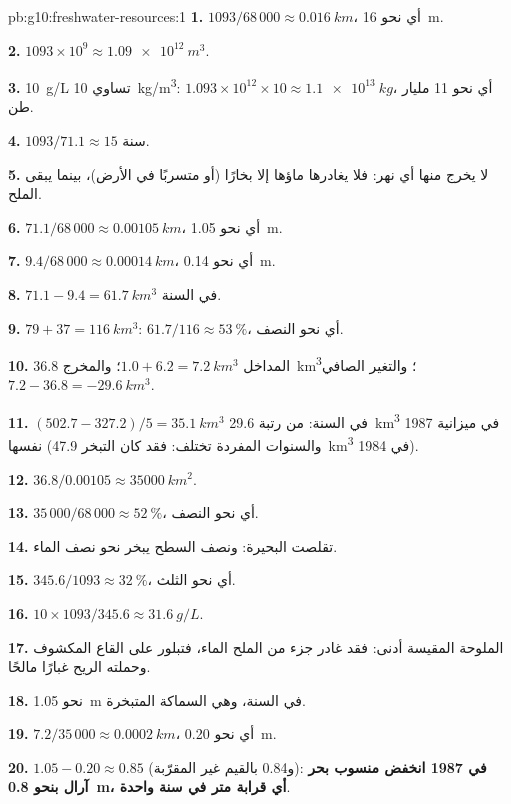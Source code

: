 \begin{solution}{pb:g10:freshwater-resources:1}
\textbf{1.} $1093/68\,000 \approx \qty{0.016}{km}$، أي نحو \qty{16}{m}.

\textbf{2.} $1093 \times 10^9 \approx \qty{1.09e12}{m^3}$.

\textbf{3.} \qty{10}{g/L} تساوي \qty{10}{kg/m^3}: $1.093 \times 10^{12} \times 10
\approx \qty{1.1e13}{kg}$، أي نحو \num{11} مليار طن.

\textbf{4.} $1093/71.1 \approx 15$ سنة.

\textbf{5.} لا يخرج منها أي نهر: فلا يغادرها ماؤها إلا بخارًا (أو متسربًا
في الأرض)، بينما يبقى الملح.

\textbf{6.} $71.1/68\,000 \approx \qty{0.00105}{km}$، أي نحو \qty{1.05}{m}.

\textbf{7.} $9.4/68\,000 \approx \qty{0.00014}{km}$، أي نحو \qty{0.14}{m}.

\textbf{8.} $71.1 - 9.4 = \qty{61.7}{km^3}$ في السنة.

\textbf{9.} $79 + 37 = \qty{116}{km^3}$: $61.7/116 \approx \qty{53}{\percent}$،
أي نحو النصف.

\textbf{10.} المداخل $1.0 + 6.2 = \qty{7.2}{km^3}$؛ والمخرج \qty{36.8}{km^3}؛
والتغير الصافي $7.2 - 36.8 = \qty{-29.6}{km^3}$.

\textbf{11.} $(502.7 - 327.2)/5 = \qty{35.1}{km^3}$ في السنة: من رتبة
\qty{29.6}{km^3} في ميزانية 1987 نفسها (والسنوات المفردة تختلف: فقد كان التبخر
\qty{47.9}{km^3} في 1984).

\textbf{12.} $36.8/0.00105 \approx \qty{35000}{km^2}$.

\textbf{13.} $35\,000/68\,000 \approx \qty{52}{\percent}$، أي نحو النصف.

\textbf{14.} تقلصت البحيرة: ونصف السطح يبخر نحو نصف
الماء.

\textbf{15.} $345.6/1093 \approx \qty{32}{\percent}$، أي نحو الثلث.

\textbf{16.} $10 \times 1093/345.6 \approx \qty{31.6}{g/L}$.

\textbf{17.} الملوحة المقيسة أدنى: فقد غادر جزء من الملح
الماء، فتبلور على القاع المكشوف وحملته الريح غبارًا
مالحًا.

\textbf{18.} نحو \qty{1.05}{m} في السنة، وهي السماكة المتبخرة.

\textbf{19.} $7.2/35\,000 \approx \qty{0.0002}{km}$، أي نحو \qty{0.20}{m}.

\textbf{20.} $1.05 - 0.20 \approx 0.85$ (و\num{0.84} بالقيم غير المقرّبة):
\textbf{في 1987 انخفض منسوب بحر آرال بنحو \qty{0.8}{m}، أي قرابة
متر في سنة واحدة}.
\end{solution}
